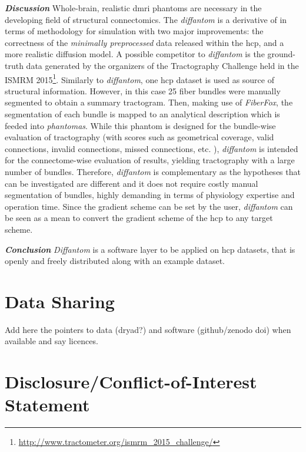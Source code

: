 \documentclass[english]{frontiers/frontiersSCNS} %
\begin{document}
\noindent\textbf{\textit{Discussion\textcolon}}\label{sec:discussion} %
Whole-brain, realistic \gls*{dmri} phantoms are necessary in the developing field of structural
  connectomics.
The \emph{diffantom} is a derivative of \citep{wilkins_fiber_2014} in terms of methodology for
  simulation with two major improvements: the correctness of the \emph{minimally preprocessed} data
  \citep{glasser_minimal_2013} released within the \gls*{hcp}, and a more realistic diffusion
  model.
A possible competitor to \emph{diffantom} is the ground-truth data generated by the organizers of the
  Tractography Challenge held in the ISMRM 2015\footnote{\url{http://www.tractometer.org/ismrm_2015_challenge/}}.
Similarly to \emph{diffantom}, one \gls*{hcp} dataset is used as source of structural information.
However, in this case 25 fiber bundles were manually segmented to obtain a summary tractogram.
Then, making use of \emph{FiberFox}, the segmentation of each bundle is mapped to an analytical description
  which is feeded into \emph{phantomas}.
While this phantom is designed for the bundle-wise evaluation of tractography (with scores such as geometrical coverage,
  valid connections, invalid connections, missed connections, etc. \citep{cote_tractometer_2013}),
  \emph{diffantom} is intended for the connectome-wise evaluation of results, yielding tractography with
  a large number of bundles.
Therefore, \emph{diffantom} is complementary as the hypotheses that can be investigated are different and
  it does not require costly manual segmentation of bundles, highly demanding in terms of physiology expertise
  and operation time.
Since the gradient scheme can be set by the user, \emph{diffantom} can be seen as a mean to convert the gradient
  scheme of the \gls*{hcp} to any target scheme.

\noindent\textbf{\textit{Conclusion\textcolon}}\label{sec:conclusion} %
\emph{Diffantom} is a software layer to be applied on \acrfull*{hcp} datasets, that is openly and freely distributed
  along with an example dataset.


\section*{Data Sharing}
{\color{red} Add here the pointers to data (dryad?) and software (github/zenodo doi) when available and say licences.}

\section*{Disclosure/Conflict-of-Interest Statement}
\end{document}
